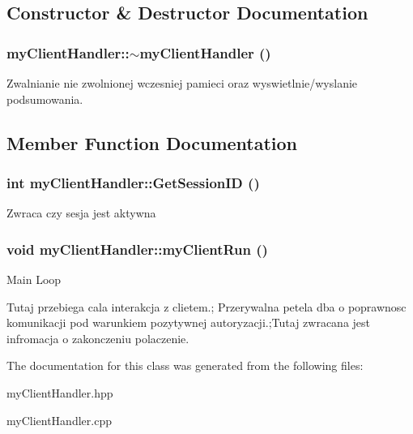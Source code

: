 \subsection{Constructor \& Destructor Documentation}
\hypertarget{classmyClientHandler_a20a6d3fcd1d40b107df3b508872e4342}{
\subsubsection[{$\sim$myClientHandler}]{\setlength{\rightskip}{0pt plus 5cm}myClientHandler::$\sim$myClientHandler ()}}
\label{classmyClientHandler_a20a6d3fcd1d40b107df3b508872e4342}


Zwalnianie nie zwolnionej wczesniej pamieci oraz wyswietlnie/wyslanie podsumowania. 



\subsection{Member Function Documentation}
\hypertarget{classmyClientHandler_a9a158082b71de6585113cfbad406ddf5}{
\subsubsection[{GetSessionID}]{\setlength{\rightskip}{0pt plus 5cm}int myClientHandler::GetSessionID ()}}
\label{classmyClientHandler_a9a158082b71de6585113cfbad406ddf5}


Zwraca czy sesja jest aktywna 

\hypertarget{classmyClientHandler_ab189bfb1e7dba2f101a187161bd03e4d}{
\subsubsection[{myClientRun}]{\setlength{\rightskip}{0pt plus 5cm}void myClientHandler::myClientRun ()}}
\label{classmyClientHandler_ab189bfb1e7dba2f101a187161bd03e4d}
Main Loop 

Tutaj przebiega cala interakcja z clietem.; Przerywalna petela dba o poprawnosc komunikacji pod warunkiem pozytywnej autoryzacji.;Tutaj zwracana jest infromacja o zakonczeniu polaczenie. 



The documentation for this class was generated from the following files:\begin{DoxyCompactItemize}
\item 
myClientHandler.hpp\item 
myClientHandler.cpp\end{DoxyCompactItemize}
